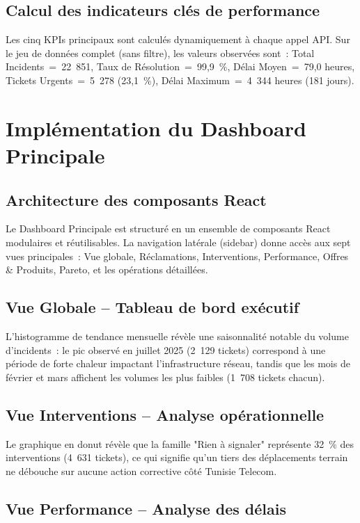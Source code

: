 \documentclass[11pt,a4paper]{report}
\begin{document}
\subsection{Calcul des indicateurs clés de performance}

Les cinq KPIs principaux sont calculés dynamiquement à chaque appel API. Sur le jeu de données complet (sans filtre), les valeurs observées sont~: Total Incidents~=~22~851, Taux de Résolution~=~99,9~\%, Délai Moyen~=~79,0 heures, Tickets Urgents~=~5~278 (23,1~\%), Délai Maximum~=~4~344 heures (181 jours).

\section{Implémentation du Dashboard Principale}

\subsection{Architecture des composants React}

Le Dashboard Principale est structuré en un ensemble de composants React modulaires et réutilisables. La navigation latérale (sidebar) donne accès aux sept vues principales~: Vue globale, Réclamations, Interventions, Performance, Offres \& Produits, Pareto, et les opérations détaillées.

\subsection{Vue Globale -- Tableau de bord exécutif}

L'histogramme de tendance mensuelle révèle une saisonnalité notable du volume d'incidents~: le pic observé en juillet 2025 (2~129 tickets) correspond à une période de forte chaleur impactant l'infrastructure réseau, tandis que les mois de février et mars affichent les volumes les plus faibles (1~708 tickets chacun).

\subsection{Vue Interventions -- Analyse opérationnelle}

Le graphique en donut révèle que la famille "Rien à signaler" représente 32~\% des interventions (4~631 tickets), ce qui signifie qu'un tiers des déplacements terrain ne débouche sur aucune action corrective côté Tunisie Telecom.

\subsection{Vue Performance -- Analyse des délais}
\end{document}
